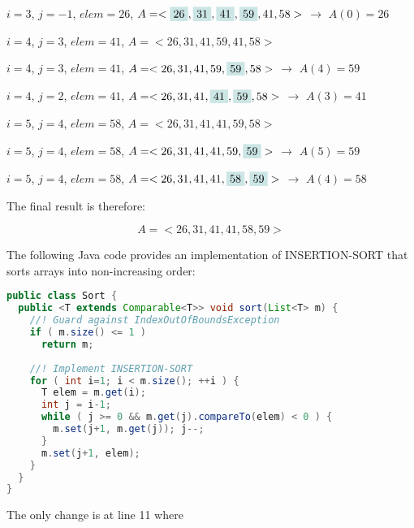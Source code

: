 \documentclass[a4paper,12pt]{article}
\begin{document}
$i=3$, $j=-1$, $elem = 26$, $A = <\colorbox{highlightcolor}{26}, \colorbox{highlightcolor}{31}, \colorbox{highlightcolor}{41}, \colorbox{highlightcolor}{59}, 41, 58>$  $\rightarrow$ $A(0) = 26$

$i=4$, $j=3$, $elem = 41$, $A = <26, 31, 41, 59, 41, 58>$

$i=4$, $j=3$, $elem = 41$, $A = <26, 31, 41, 59, \colorbox{highlightcolor}{59}, 58>$ $\rightarrow$ $A(4) = 59$

$i=4$, $j=2$, $elem = 41$, $A = <26, 31, 41, \colorbox{highlightcolor}{41}, \colorbox{highlightcolor}{59}, 58>$ $\rightarrow$ $A(3) = 41$

$i=5$, $j=4$, $elem = 58$, $A = <26, 31, 41, 41, 59, 58>$

$i=5$, $j=4$, $elem = 58$, $A = <26, 31, 41, 41, 59, \colorbox{highlightcolor}{59}>$ $\rightarrow$ $A(5) = 59$

$i=5$, $j=4$, $elem = 58$, $A = <26, 31, 41, 41, \colorbox{highlightcolor}{58}, \colorbox{highlightcolor}{59}>$ $\rightarrow$ $A(4) = 58$

\newpage
The final result is therefore:

\[ A = <26, 31, 41, 41, 58, 59> \]

\vspace{5mm}

The following Java code provides an implementation of INSERTION-SORT that sorts arrays into non-increasing order:

\begin{lstlisting}[language=Java]
public class Sort {
  public <T extends Comparable<T>> void sort(List<T> m) {
    //! Guard against IndexOutOfBoundsException
    if ( m.size() <= 1 ) 
      return m;
      
    //! Implement INSERTION-SORT
    for ( int i=1; i < m.size(); ++i ) {
      T elem = m.get(i);
      int j = i-1;
      while ( j >= 0 && m.get(j).compareTo(elem) < 0 ) {
        m.set(j+1, m.get(j)); j--;
      }
      m.set(j+1, elem);
    }
  }
}
\end{lstlisting}

The only change is at line 11 where
\end{document}
